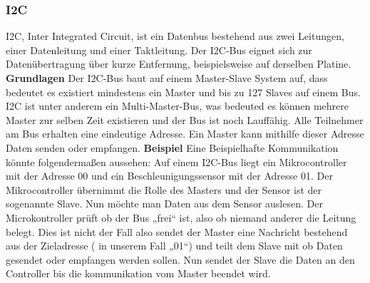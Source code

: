 \subsubsection{I2C}
\label{subsec:I2C}
I2C, Inter Integrated Circuit, ist ein Datenbus bestehend aus zwei Leitungen, einer Datenleitung und einer Taktleitung. Der I2C-Bus eignet sich zur Datenübertragung über kurze Entfernung, beispielsweise auf derselben Platine.
\nextline
\textbf{Grundlagen\nextline}
Der I2C-Bus baut auf einem Master-Slave System auf, dass bedeutet es existiert mindestens ein Master und bis zu 127 Slaves auf einem Bus. I2C ist unter anderem ein Multi-Master-Bus, was bedeuted es können mehrere Master zur selben Zeit existieren und der Bus ist noch Lauffähig.
Alle Teilnehmer am Bus erhalten eine eindeutige Adresse. Ein Master kann mithilfe dieser Adresse Daten senden oder empfangen.
\nextline
\textbf{Beispiel\nextline}
Eine Beispielhafte Kommunikation könnte folgendermaßen aussehen:
\nextline
Auf einem I2C-Bus liegt ein Mikrocontroller mit der Adresse 00 und ein Beschleunigungssensor mit der Adresse 01. Der Mikrocontroller übernimmt die Rolle des Masters und der Sensor ist der sogenannte Slave. Nun möchte man Daten aus dem Sensor auslesen. Der Microkontroller prüft ob der Bus „frei“ ist, also ob niemand anderer die Leitung belegt. Dies ist nicht der Fall also sendet der Master eine Nachricht bestehend aus der Zieladresse ( in unserem Fall „01“) und teilt dem Slave mit ob Daten gesendet oder empfangen werden sollen. Nun sendet der Slave die Daten an den Controller bis die kommunikation vom Master beendet wird.


\clearpage %